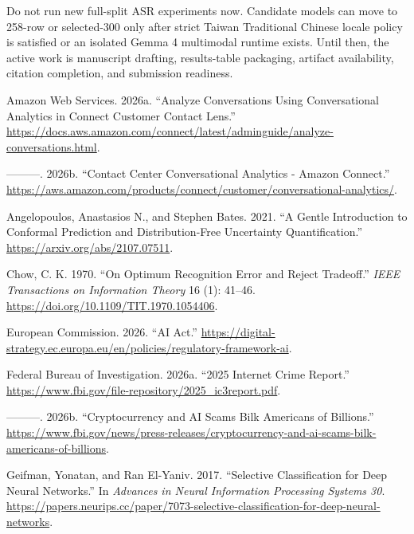 \documentclass[
]{article}
\newlength{\cslhangindent}
\newlength{\cslentryspacingunit} %
\newenvironment{CSLReferences}[2] %
 {%
  \setlength{\parindent}{0pt}
  \ifodd #1
  \let\oldpar\par
  \def\par{\hangindent=\cslhangindent\oldpar}
  \fi
  \setlength{\parskip}{#2\cslentryspacingunit}
 }%
 {}
\begin{document}
Do not run new full-split ASR experiments now. Candidate models can move
to 258-row or selected-300 only after strict Taiwan Traditional Chinese
locale policy is satisfied or an isolated Gemma 4 multimodal runtime
exists. Until then, the active work is manuscript drafting,
results-table packaging, artifact availability, citation completion, and
submission readiness.

\hypertarget{refs}{}
\begin{CSLReferences}{1}{0}
\leavevmode{}%
Amazon Web Services. 2026a. {``Analyze Conversations Using
Conversational Analytics in Connect Customer Contact Lens.''}
\url{https://docs.aws.amazon.com/connect/latest/adminguide/analyze-conversations.html}.

\leavevmode{}%
---------. 2026b. {``Contact Center Conversational Analytics - Amazon
Connect.''}
\url{https://aws.amazon.com/products/connect/customer/conversational-analytics/}.

\leavevmode{}%
Angelopoulos, Anastasios N., and Stephen Bates. 2021. {``A Gentle
Introduction to Conformal Prediction and Distribution-Free Uncertainty
Quantification.''} \url{https://arxiv.org/abs/2107.07511}.

\leavevmode{}%
Chow, C. K. 1970. {``On Optimum Recognition Error and Reject
Tradeoff.''} \emph{IEEE Transactions on Information Theory} 16 (1):
41--46. \url{https://doi.org/10.1109/TIT.1970.1054406}.

\leavevmode{}%
European Commission. 2026. {``AI Act.''}
\url{https://digital-strategy.ec.europa.eu/en/policies/regulatory-framework-ai}.

\leavevmode{}%
Federal Bureau of Investigation. 2026a. {``2025 Internet Crime
Report.''} \url{https://www.fbi.gov/file-repository/2025_ic3report.pdf}.

\leavevmode{}%
---------. 2026b. {``Cryptocurrency and AI Scams Bilk Americans of
Billions.''}
\url{https://www.fbi.gov/news/press-releases/cryptocurrency-and-ai-scams-bilk-americans-of-billions}.

\leavevmode{}%
Geifman, Yonatan, and Ran El-Yaniv. 2017. {``Selective Classification
for Deep Neural Networks.''} In \emph{Advances in Neural Information
Processing Systems 30}.
\url{https://papers.neurips.cc/paper/7073-selective-classification-for-deep-neural-networks}.


\end{CSLReferences}
\end{document}
